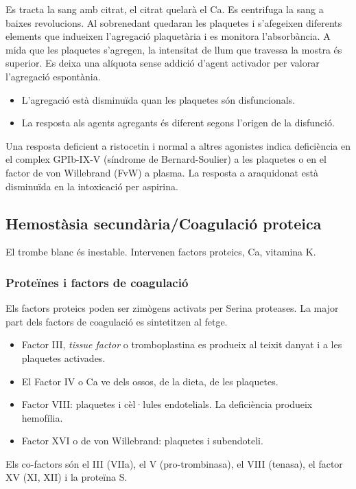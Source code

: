 Es tracta la sang amb citrat, el citrat quelarà el Ca. Es centrifuga
la sang a baixes revolucions. Al sobrenedant quedaran les plaquetes i
s'afegeixen diferents elements que indueixen l'agregació plaquetària i
es monitora l'absorbància. A mida que les plaquetes s’agregen,
la intensitat de llum que travessa la mostra és superior. Es deixa una
alíquota sense addició d’agent activador per valorar l’agregació
espontània.

\begin{itemize}
\item  L’agregació està disminuïda quan les plaquetes són disfuncionals.
\item La resposta als agents agregants és diferent segons l’origen de la disfunció.
\end{itemize}

Una resposta deficient a ristocetin i normal a altres agonistes indica
deficiència en el complex GPIb-IX-V (síndrome de Bernard-Soulier) a
les plaquetes o en el factor de von Willebrand (FvW) a plasma. La
resposta a araquidonat està disminuïda en la intoxicació per aspirina.

\subsection{Hemostàsia secundària/Coagulació proteica}
El trombe blanc és inestable. Intervenen factors proteics, Ca,
vitamina K. 

\subsubsection{Proteïnes i factors de coagulació}
\label{sec:proteines-i-factors}
Els factors proteics poden ser zimògens activats per
Serina proteases. La major part dels factors de coagulació es
sintetitzen al fetge. 
\begin{itemize}
\item Factor III, \textit{tissue factor} o tromboplastina es
produeix al teixit danyat i a les plaquetes activades. 
\item El Factor IV o Ca ve dels ossos, de la dieta, de les plaquetes.
\item Factor VIII: plaquetes i cèl·lules endotelials. La deficiència
  produeix hemofília.
\item Factor XVI o de von Willebrand: plaquetes i subendoteli.
\end{itemize}

Els co-factors són el III (VIIa), el V (pro-trombinasa), el VIII
(tenasa), el factor XV (XI, XII) i la proteïna S.

